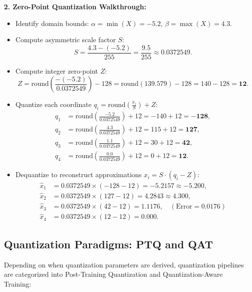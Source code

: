 \documentclass[../../../main.tex]{subfiles}
\begin{document}
\noindent\textbf{2. Zero-Point Quantization Walkthrough:}
\begin{itemize}
    \item Identify domain bounds: $\alpha = \min(X) = -5.2$, $\beta = \max(X) = 4.3$.
    \item Compute asymmetric scale factor $S$:
    \begin{equation}
    S = \frac{4.3 - (-5.2)}{255} = \frac{9.5}{255} \approx 0.0372549.
    \end{equation}
    \item Compute integer zero-point $Z$:
    \begin{equation}
    Z = \text{round}\left(\frac{-(-5.2)}{0.0372549}\right) - 128 = \text{round}(139.579) - 128 = 140 - 128 = \mathbf{12}.
    \end{equation}
    \item Quantize each coordinate $q_i = \text{round}\left(\frac{x_i}{S}\right) + Z$:
    \begin{align}
    q_1 &= \text{round}\left(\frac{-5.2}{0.0372549}\right) + 12 = -140 + 12 = \mathbf{-128}, \\
    q_2 &= \text{round}\left(\frac{4.3}{0.0372549}\right) + 12 = 115 + 12 = \mathbf{127}, \\
    q_3 &= \text{round}\left(\frac{1.1}{0.0372549}\right) + 12 = 30 + 12 = \mathbf{42}, \\
    q_4 &= \text{round}\left(\frac{0.0}{0.0372549}\right) + 12 = 0 + 12 = \mathbf{12}.
    \end{align}
    \item Dequantize to reconstruct approximations $\hat{x}_i = S \cdot (q_i - Z)$:
    \begin{align}
    \hat{x}_1 &= 0.0372549 \times (-128 - 12) = -5.2157 \approx -5.200, \\
    \hat{x}_2 &= 0.0372549 \times (127 - 12) = 4.2843 \approx 4.300, \\
    \hat{x}_3 &= 0.0372549 \times (42 - 12) = 1.1176, \quad (\text{Error} = 0.0176) \\
    \hat{x}_4 &= 0.0372549 \times (12 - 12) = 0.000.
    \end{align}
\end{itemize}

\subsection{Quantization Paradigms: PTQ and QAT}
\label{subsec:ptq_vs_qat}

Depending on when quantization parameters are derived, quantization pipelines are categorized into Post-Training Quantization and Quantization-Aware Training:
\end{document}
